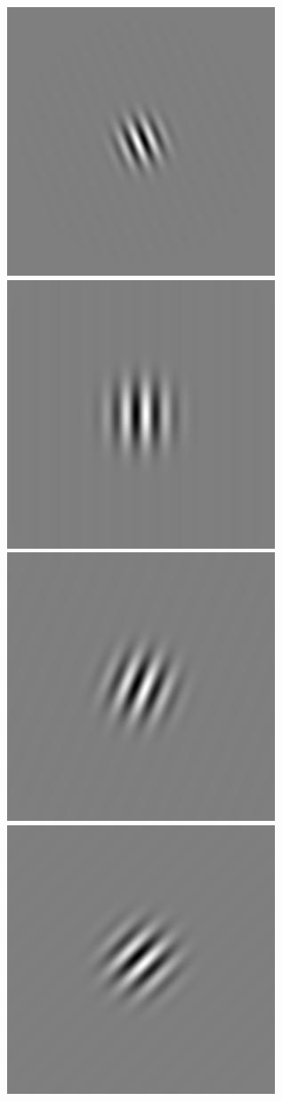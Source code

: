 \begin{figure}
\begin{center}
 \includegraphics[scale=0.1]{ch4/figures/iGabor3_7.jpg}\\
 \includegraphics[scale=0.1]{ch4/figures/iGabor4_0.jpg}
 \includegraphics[scale=0.1]{ch4/figures/iGabor4_1.jpg}
 \includegraphics[scale=0.1]{ch4/figures/iGabor4_2.jpg}

\end{center}
\end{figure}
